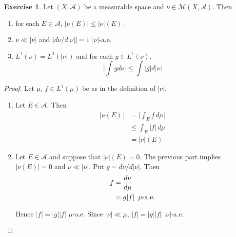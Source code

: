 \documentclass[12pt]{amsart}
\theoremstyle{definition}
\newtheorem{ex}[definition]{Exercise}
\newcommand{\MA}{\mathcal{A}}
\newcommand{\MM}{\mathcal{M}}
\newcommand{\dmu}{\, d \mu}
\newcommand{\lex}[1]{\label{ex:#1}}
\begin{document}
	\begin{ex} \lex{43009} 
		Let $(X, \MA)$ be a measurable space and $\nu \in \MM(X, \MA)$. Then 
		
		\begin{enumerate}
			\item for each $E \in \MA$, $|\nu(E)| \leq |\nu|(E)$. 
			\item $\nu \ll |\nu|$ and $\big|d \nu /d |\nu|\big| = 1$ $|\nu|$-a.e.
			\item $L^1(\nu) = L^1(|\nu|)$ and for each $g \in L^1(\nu)$, $$ \bigg|\int g d\nu \bigg| \leq \int |g|d |\nu|$$
		\end{enumerate}
	\end{ex}
	
	\begin{proof}
		Let $\mu$, $f \in L^1(\mu)$ be as in the definition of $|\nu|$.
		\begin{enumerate}
			\item Let $E \in \MA$. Then 
			\begin{align*}
				|\nu(E)| 
				& = \bigg|\int_E f \dmu\bigg|\\
				& \leq \int_E |f| \dmu\\
				&= |\nu|(E)
			\end{align*}
			
			\item Let $E \in \MA$ and suppose that $|\nu|(E)=0$. The previous part implies $|\nu(E)|=0$ and $\nu \ll |\nu|$. Put $g = d \nu / d|\nu|$. Then 
			\begin{align*}
				f 
				&= \frac{d\nu}{d\mu}\\
				&= g|f| \hspace{2mm }\mu\text{-a.e.}
			\end{align*}
			
			Hence $|f| = |g||f|$ $\mu$-a.e. Since $|\nu| \ll \mu$, $|f| = |g||f|$ $|\nu|$-a.e.
			

\end{enumerate}
\end{proof}
\end{document}
